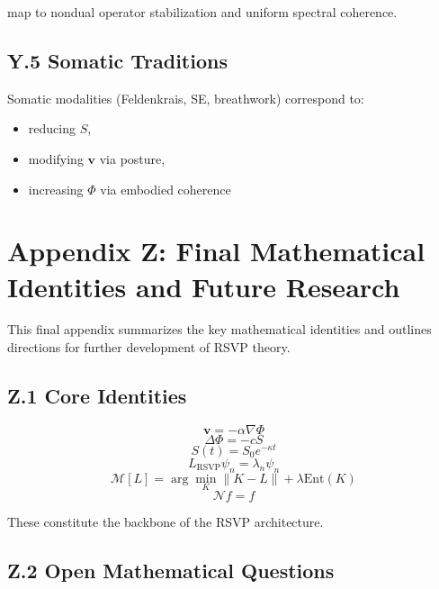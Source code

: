 \documentclass[12pt]{article}
\begin{document}
map to nondual operator stabilization and uniform spectral coherence.

\subsection*{Y.5 Somatic Traditions}

Somatic modalities (Feldenkrais, SE, breathwork) correspond to:

\begin{itemize}
\item reducing $S$,
\item modifying $\mathbf{v}$ via posture,
\item increasing $\Phi$ via embodied coherence
\end{itemize}



\section*{Appendix Z: Final Mathematical Identities and Future Research}

This final appendix summarizes the key mathematical identities and outlines
directions for further development of RSVP theory.

\subsection*{Z.1 Core Identities}

\[
\mathbf{v} = -\alpha \nabla\Phi
\]
\[
\Delta \Phi = -c S
\]
\[
S(t) = S_0 e^{-\kappa t}
\]
\[
L_{\text{RSVP}}\psi_n = \lambda_n\psi_n
\]
\[
\mathcal{M}[L] = \arg\min_K \|K-L\| + \lambda \mathrm{Ent}(K)
\]
\[
\mathcal{N}f = f
\]

These constitute the backbone of the RSVP architecture.

\subsection*{Z.2 Open Mathematical Questions}
\end{document}
